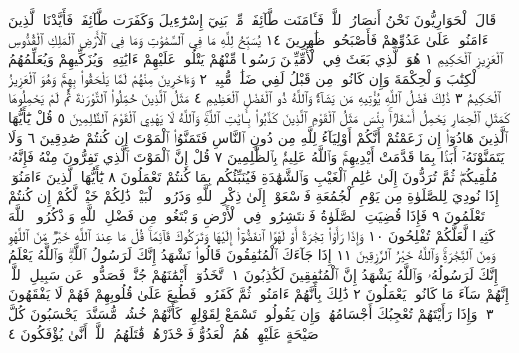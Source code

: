 قَالَ ٱلْحَوَارِيُّونَ نَحْنُ أَنصَارُ ٱللَّهِۖ فَـَٔامَنَت طَّآئِفَةࣱ مِّنۢ بَنِيٓ إِسْرَٰٓءِيلَ
وَكَفَرَت طَّآئِفَةࣱۖ فَأَيَّدْنَا ٱلَّذِينَ ءَامَنُوا۟ عَلَىٰ عَدُوِّهِمْ فَأَصْبَحُوا۟ ظَٰهِرِينَ ١٤
يُسَبِّحُ لِلَّهِ مَا فِي ٱلسَّمَٰوَٰتِ وَمَا فِي ٱلْأَرْضِ ٱلْمَلِكِ ٱلْقُدُّوسِ ٱلْعَزِيزِ
ٱلْحَكِيمِ ١ هُوَ ٱلَّذِي بَعَثَ فِي ٱلْأُمِّيِّـۧنَ رَسُولࣰا مِّنْهُمْ يَتْلُوا۟ عَلَيْهِمْ
ءَايَٰتِهِۦ وَيُزَكِّيهِمْ وَيُعَلِّمُهُمُ ٱلْكِتَٰبَ وَٱلْحِكْمَةَ وَإِن كَانُوا۟
مِن قَبْلُ لَفِي ضَلَٰلࣲ مُّبِينࣲ ٢ وَءَاخَرِينَ مِنْهُمْ لَمَّا يَلْحَقُوا۟ بِهِمْۚ
وَهُوَ ٱلْعَزِيزُ ٱلْحَكِيمُ ٣ ذَٰلِكَ فَضْلُ ٱللَّهِ يُؤْتِيهِ مَن يَشَآءُۚ وَٱللَّهُ
ذُو ٱلْفَضْلِ ٱلْعَظِيمِ ٤ مَثَلُ ٱلَّذِينَ حُمِّلُوا۟ ٱلتَّوْرَىٰةَ ثُمَّ لَمْ
يَحْمِلُوهَا كَمَثَلِ ٱلْحِمَارِ يَحْمِلُ أَسْفَارَۢاۚ بِئْسَ مَثَلُ ٱلْقَوْمِ
ٱلَّذِينَ كَذَّبُوا۟ بِـَٔايَٰتِ ٱللَّهِۚ وَٱللَّهُ لَا يَهْدِي ٱلْقَوْمَ ٱلظَّٰلِمِينَ ٥
قُلْ يَٰٓأَيُّهَا ٱلَّذِينَ هَادُوٓا۟ إِن زَعَمْتُمْ أَنَّكُمْ أَوْلِيَآءُ لِلَّهِ مِن
دُونِ ٱلنَّاسِ فَتَمَنَّوُا۟ ٱلْمَوْتَ إِن كُنتُمْ صَٰدِقِينَ ٦ وَلَا يَتَمَنَّوْنَهُۥٓ
أَبَدَۢا بِمَا قَدَّمَتْ أَيْدِيهِمْۚ وَٱللَّهُ عَلِيمُۢ بِٱلظَّٰلِمِينَ ٧ قُلْ
إِنَّ ٱلْمَوْتَ ٱلَّذِي تَفِرُّونَ مِنْهُ فَإِنَّهُۥ مُلَٰقِيكُمْۖ ثُمَّ تُرَدُّونَ
إِلَىٰ عَٰلِمِ ٱلْغَيْبِ وَٱلشَّهَٰدَةِ فَيُنَبِّئُكُم بِمَا كُنتُمْ تَعْمَلُونَ ٨
يَٰٓأَيُّهَا ٱلَّذِينَ ءَامَنُوٓا۟ إِذَا نُودِيَ لِلصَّلَوٰةِ مِن يَوْمِ ٱلْجُمُعَةِ فَٱسْعَوْا۟
إِلَىٰ ذِكْرِ ٱللَّهِ وَذَرُوا۟ ٱلْبَيْعَۚ ذَٰلِكُمْ خَيْرࣱ لَّكُمْ إِن كُنتُمْ تَعْلَمُونَ ٩
فَإِذَا قُضِيَتِ ٱلصَّلَوٰةُ فَٱنتَشِرُوا۟ فِي ٱلْأَرْضِ وَٱبْتَغُوا۟
مِن فَضْلِ ٱللَّهِ وَٱذْكُرُوا۟ ٱللَّهَ كَثِيرࣰا لَّعَلَّكُمْ تُفْلِحُونَ ١٠
وَإِذَا رَأَوْا۟ تِجَٰرَةً أَوْ لَهْوًا ٱنفَضُّوٓا۟ إِلَيْهَا وَتَرَكُوكَ قَآئِمࣰاۚ قُلْ مَا عِندَ
ٱللَّهِ خَيْرࣱ مِّنَ ٱللَّهْوِ وَمِنَ ٱلتِّجَٰرَةِۚ وَٱللَّهُ خَيْرُ ٱلرَّٰزِقِينَ ١١
إِذَا جَآءَكَ ٱلْمُنَٰفِقُونَ قَالُوا۟ نَشْهَدُ إِنَّكَ لَرَسُولُ ٱللَّهِۗ وَٱللَّهُ يَعْلَمُ إِنَّكَ
لَرَسُولُهُۥ وَٱللَّهُ يَشْهَدُ إِنَّ ٱلْمُنَٰفِقِينَ لَكَٰذِبُونَ ١ ٱتَّخَذُوٓا۟
أَيْمَٰنَهُمْ جُنَّةࣰ فَصَدُّوا۟ عَن سَبِيلِ ٱللَّهِۚ إِنَّهُمْ سَآءَ مَا كَانُوا۟
يَعْمَلُونَ ٢ ذَٰلِكَ بِأَنَّهُمْ ءَامَنُوا۟ ثُمَّ كَفَرُوا۟ فَطُبِعَ عَلَىٰ قُلُوبِهِمْ فَهُمْ
لَا يَفْقَهُونَ ٣۞ وَإِذَا رَأَيْتَهُمْ تُعْجِبُكَ أَجْسَامُهُمْۖ وَإِن يَقُولُوا۟
تَسْمَعْ لِقَوْلِهِمْۖ كَأَنَّهُمْ خُشُبࣱ مُّسَنَّدَةࣱۖ يَحْسَبُونَ كُلَّ صَيْحَةٍ
عَلَيْهِمْۚ هُمُ ٱلْعَدُوُّ فَٱحْذَرْهُمْۚ قَٰتَلَهُمُ ٱللَّهُۖ أَنَّىٰ يُؤْفَكُونَ ٤
